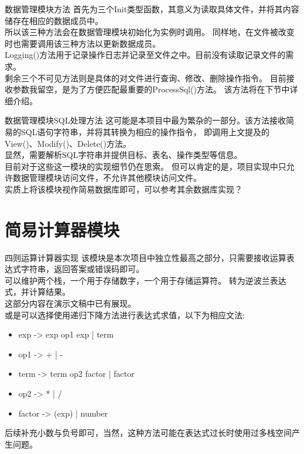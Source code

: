 \documentclass[10pt]{beamer}
\begin{document}
\begin{frame}{数据管理模块方法}
    首先为三个Init类型函数，其意义为读取具体文件，并将其内容储存在相应的数据成员中。\\
    所以该三种方法会在数据管理模块初始化为实例时调用。
    同样地，在文件被改变时也需要调用该三种方法以更新数据成员。\\
    Logging()方法用于记录操作日志并记录至文件之中。目前没有读取记录文件的需求。\\
    剩余三个不可见方法则是具体的对文件进行查询、修改、删除操作指令。
    目前接收参数我留空，是为了方便匹配最重要的ProcessSql()方法。
    该方法将在下节中详细介绍。\\
\end{frame}

\begin{frame}{数据管理模块SQL处理方法}
    这可能是本项目中最为繁杂的一部分。该方法接收简易的SQL语句字符串，并将其转换为相应的操作指令，
    即调用上文提及的View()、Modify()、Delete()方法。\\
    显然，需要解析SQL字符串并提供目标、表名、操作类型等信息。\\
    目前对于这些这一模块的实现细节仍在思索。
    但可以肯定的是，项目实现中只允许数据管理模块访问文件，不允许其他模块访问文件。\\
    实质上将该模块视作简易数据库即可，可以参考其余数据库实现？
\end{frame}

\section{简易计算器模块}

\begin{frame}{四则运算计算器实现}
    该模块是本次项目中独立性最高之部分，只需要接收运算表达式字符串，返回答案或错误码即可。\\
    可以维护两个栈，一个用于存储数字，一个用于存储运算符。
    转为逆波兰表达式，并计算结果。\\
    这部分内容在演示文稿中已有展现。\\
    或是可以选择使用递归下降方法进行表达式求值，以下为相应文法:\\
    \begin{itemize}
        \item exp -> exp op1 exp | term
        \item op1 -> + | -
        \item term -> term op2 factor | factor
        \item op2 -> * | /
        \item factor -> (exp) | number
    \end{itemize}
    后续补充小数与负号即可，当然，这种方法可能在表达式过长时使用过多栈空间产生问题。\\
\end{frame}
\end{document}
